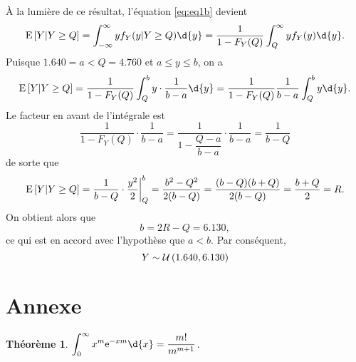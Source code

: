 \documentclass[11pt]{article}
\newtheorem{theoreme}{Théorème}
\newcommand\Espg[2]{%
	\ensuremath{%
		\mathrm{E}\left[#1\middle\rvert#2\right]%
	}%
}%
\newcommand\Uni[2]{%
	\ensuremath{%
		\mathcal{U}\left(#1,#2\right)%
	}%
}%
\newcommand\e{%
    \ensuremath{%
        \mathrm{e}%
    }%
}
\begin{document}
À la lumière de ce résultat, l'équation \eqref{eq:eq1b} devient
\begin{equation*}
    \Espg{Y}{Y\geq Q}
    =\int_{-\infty}^\infty yf_Y(y|Y\geq Q)\d{y}
    =\frac{1}{1-F_Y(Q)}\int_Q^\infty yf_Y(y)\d{y}.
\end{equation*}
Puisque $1.640=a<Q=4.760$ et $a\leq y\leq b$, on a
\begin{equation*}
    \Espg{Y}{Y\geq Q}
    =\frac{1}{1-F_Y(Q)}\int_Q^by\cdot\frac{1}{b-a}\d{y}
    =\frac{1}{1-F_Y(Q)}\frac{1}{b-a}\int_Q^by\d{y}.
\end{equation*}
Le facteur en avant de l'intégrale est
\begin{equation*}
    \frac{1}{1-F_Y(Q)}\cdot\frac{1}{b-a}
    =\frac{1}{1-\dfrac{Q-a}{b-a}}\cdot\frac{1}{b-a}
    =\frac{1}{b-Q}
\end{equation*}
de sorte que
\begin{equation*}
    \Espg{Y}{Y\geq Q}
    =\frac{1}{b-Q}\cdot\frac{y^2}{2}\bigg\rvert_Q^b
    =\frac{b^2-Q^2}{2(b-Q)}
    =\frac{(b-Q)(b+Q)}{2(b-Q)}
    =\frac{b+Q}{2}
    =R.
\end{equation*}
On obtient alors que
\begin{equation*}
    b
    =2R-Q
    =6.130,
\end{equation*}
ce qui est en accord avec l'hypothèse que $a<b$. Par conséquent,
\begin{equation*}
    Y\sim\Uni{1.640}{6.130}
\end{equation*}


\pagebreak
\section*{Annexe}
\begin{theoreme}\label{th:integrale}
    $\displaystyle\int_0^\infty x^m\e^{-xm}\d{x}=\dfrac{m!}{m^{m+1}}$.
\end{theoreme}
\end{document}
